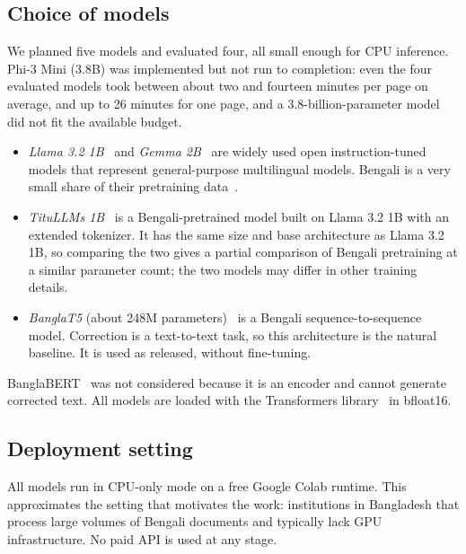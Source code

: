 \documentclass[conference]{IEEEtran}
\begin{document}
\subsection{Choice of models}
We planned five models and evaluated four, all small enough for CPU inference. Phi-3 Mini (3.8B) was implemented but not run to completion: even the four evaluated models took between about two and fourteen minutes per page on average, and up to 26 minutes for one page, and a 3.8-billion-parameter model did not fit the available budget.
\begin{itemize}
\item \emph{Llama 3.2 1B}~\cite{meta2024llama32} and \emph{Gemma 2B}~\cite{gemma2024} are widely used open instruction-tuned models that represent general-purpose multilingual models. Bengali is a very small share of their pretraining data~\cite{zehady2026banglallama}.
\item \emph{TituLLMs 1B}~\cite{nahin2025titullms} is a Bengali-pretrained model built on Llama 3.2 1B with an extended tokenizer. It has the same size and base architecture as Llama 3.2 1B, so comparing the two gives a partial comparison of Bengali pretraining at a similar parameter count; the two models may differ in other training details.
\item \emph{BanglaT5} (about 248M parameters)~\cite{bhattacharjee2023banglat5} is a Bengali sequence-to-sequence model. Correction is a text-to-text task, so this architecture is the natural baseline. It is used as released, without fine-tuning.
\end{itemize}
BanglaBERT~\cite{bhattacharjee2022banglabert} was not considered because it is an encoder and cannot generate corrected text. All models are loaded with the Transformers library~\cite{wolf2020transformers} in bfloat16.

\subsection{Deployment setting}
All models run in CPU-only mode on a free Google Colab runtime. This approximates the setting that motivates the work: institutions in Bangladesh that process large volumes of Bengali documents and typically lack GPU infrastructure. No paid API is used at any stage.
\end{document}
